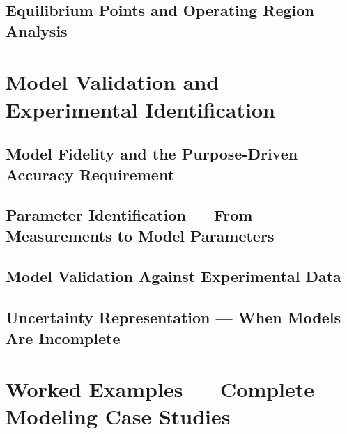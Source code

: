 \documentclass[11pt,letterpaper]{article}
\begin{document}


\subsection{Equilibrium Points and Operating Region Analysis}
\label{sec:equilibrium_analysis}



\section{Model Validation and Experimental Identification}
\label{sec:model_validation}

\subsection{Model Fidelity and the Purpose-Driven Accuracy Requirement}
\label{sec:model_fidelity}



\subsection{Parameter Identification --- From Measurements to Model Parameters}
\label{sec:param_identification}



\subsection{Model Validation Against Experimental Data}
\label{sec:model_validation_data}



\subsection{Uncertainty Representation --- When Models Are Incomplete}
\label{sec:uncertainty}



\section{Worked Examples --- Complete Modeling Case Studies}
\label{sec:worked_examples}
\end{document}
